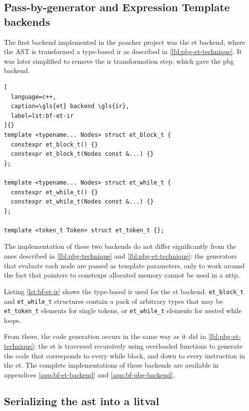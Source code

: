 \documentclass[../main]{subfiles}
\begin{document}
\subsection{
  Pass-by-generator and Expression Template backends
}

The first backend implemented in the poacher project was the \gls{et} backend,
where the AST is transformed a type-based \gls{ir}
as described in \ref{lbl:pbg-et-technique}. It was later simplified to
remove the \gls{ir} transformation step, which gave the \gls{pbg} backend.

\begin{lstlisting}[
  language=c++,
  caption=\gls{et} backend \gls{ir},
  label=lst:bf-et-ir
]{}
template <typename... Nodes> struct et_block_t {
  constexpr et_block_t() {}
  constexpr et_block_t(Nodes const &...) {}
};

template <typename... Nodes> struct et_while_t {
  constexpr et_while_t() {}
  constexpr et_while_t(Nodes const &...) {}
};

template <token_t Token> struct et_token_t {};
\end{lstlisting}

The implementation of these two backends do not differ significantly from
the ones described in \ref{lbl:pbg-technique} and \ref{lbl:pbg-et-technique}:
the generators that evaluate each node are passed as template parameters,
only to work around the fact that pointers to \gls{constexpr} allocated memory
cannot be used in a \gls{nttp}.

Listing \ref{lst:bf-et-ir} shows the type-based \gls{ir} used for the \gls{et}
backend. \lstinline{et_block_t} and \lstinline{et_while_t} structures contain a
pack of arbitrary types that may be \lstinline{et_token_t} elements for single
tokens, or \lstinline{et_while_t} elements for nested while loops.

From there, the code generation occurs in the same way as it did in
\ref{lbl:pbg-et-technique}: the \gls{et} is traversed recursively using
overloaded functions to generate the \cpp code that corresponds to every
while block, and down to every instruction in the \gls{et}.
The complete implementations of these backends are available in appendices
\ref{app:bf-et-backend} and \ref{app:bf-pbg-backend}.

\subsection{
  Serializing the \gls{ast} into a \gls{litval}
}
\end{document}
